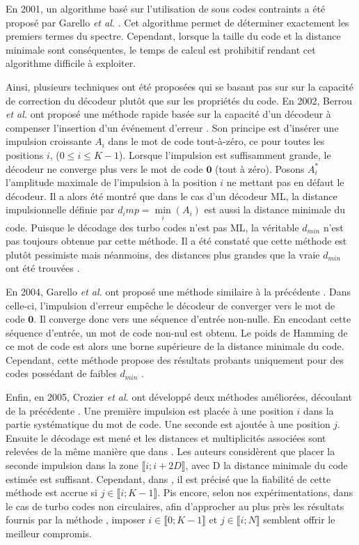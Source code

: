 En 2001, un algorithme basé sur l'utilisation de sous codes contraints a été proposé par Garello \textit{et al.} \cite{garellodfree}. Cet algorithme permet de déterminer exactement les premiers termes du spectre. Cependant, lorsque la taille du code et la distance minimale sont conséquentes, le temps de calcul est prohibitif rendant cet algorithme difficile à exploiter.
	
Ainsi, plusieurs techniques ont été proposées qui se basant pas sur sur la capacité de correction du décodeur plutôt que sur les propriétés du code. En 2002, Berrou \textit{et al.} ont proposé une méthode rapide basée sur la capacité d'un décodeur à compenser l'insertion d'un événement d'erreur \cite{eim}. Son principe est d'insérer une impulsion croissante $A_i$ dans le mot de code tout-à-zéro, ce pour toutes les positions $i$, ($0\le i \le K-1$). Lorsque l'impulsion est suffisamment grande, le décodeur ne converge plus vers le mot de code $\mathbf{0}$ (tout à zéro). Posons $A_i^*$ l'amplitude maximale de l’impulsion à la position $i$ ne mettant pas en défaut le décodeur. Il a alors été montré que dans le cas d'un décodeur ML, la distance impulsionnelle définie par $d_imp = \min\limits_i (A_i)$ est aussi la distance minimale du code. Puisque le décodage des turbo codes n'est pas ML, la véritable $d_{min}$ n'est pas toujours obtenue par cette méthode. Il a été constaté que cette méthode est plutôt pessimiste mais néanmoins, des distances plus grandes que la vraie $d_{min}$ ont été trouvées \cite{yocComparisonMethods}.
	
En 2004, Garello \textit{et al.} ont proposé une méthode similaire à la précédente \cite{garelloAllZero}. Dans celle-ci, l'impulsion d'erreur empêche le décodeur de converger vers le mot de code $\mathbf{0}$. Il converge donc vers une séquence d'entrée non-nulle. En encodant cette séquence d'entrée, un mot de code non-nul est obtenu. Le poids de Hamming de ce mot de code est alors une borne supérieure de la distance minimale du code. Cependant, cette méthode propose des résultats probants uniquement pour des codes possédant de faibles $d_{min}$ \cite{yocComparisonMethods}.
	
Enfin, en 2005, Crozier \textit{et al.} ont développé deux méthodes améliorées, découlant de la précédente \cite{crozierDIM}. Une première impulsion est placée à une position $i$ dans la partie systématique du mot de code. Une seconde est ajoutée à une position $j$. Ensuite le décodage est mené et les distances et multiplicités associées sont relevées de la même manière que dans \cite{garelloAllZero}. Les auteurs considèrent que placer la seconde impulsion dans la zone $\llbracket i; i+2D\rrbracket$, avec D la distance minimale du code estimée est suffisant. Cependant, dans \cite{yocComparisonMethods}, il est précisé que la fiabilité de cette méthode est accrue si $j \in \llbracket i; K-1\rrbracket$. Pis encore, selon nos expérimentations, dans le cas de turbo codes non circulaires, afin d’approcher au plus près les résultats fournis par la méthode \cite{garellodfree}, imposer $i \in \llbracket 0; K-1\rrbracket$ et $j \in \llbracket i; N\rrbracket$ semblent offrir le meilleur compromis.
	
